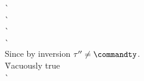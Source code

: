 \begin{description}
\begin{tabbing}
    \`  \\
    \`  \\
    \`  \\
    \`  \\

  Since  by inversion $\tau'' \not= \commandty$. \\
    \` Vacuously true \\

    \`  \\

  \end{tabbing}


\end{description}
